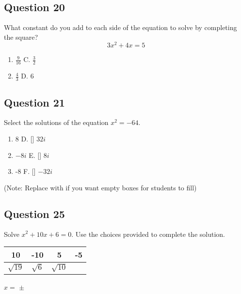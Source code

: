 \documentclass[12pt]{article}
\begin{document}
\subsection*{Question 20}
What constant do you add to each side of the equation to solve by completing the square?
\[ 3x^2 + 4x = 5 \]
\begin{enumerate}[label=\Alph*.]
    \item \( \frac{9}{16} \) \qquad C. \( \frac{3}{2} \)
    \item \( \frac{4}{3} \) \qquad D. \( 6 \)
\end{enumerate}

\subsection*{Question 21}
Select the solutions of the equation \( x^2 = -64 \).
\begin{enumerate}[label=\Alph*.]
    \item[\XBox] 8 \qquad \qquad D. [\XBox] \(32i\)
    \item[\XBox] \(-8i\) \qquad \quad E. [\XBox] \(8i\)
    \item[\XBox] -8 \qquad \qquad F. [\XBox] \(-32i\)
\end{enumerate}
(Note: Replace \XBox with \Square if you want empty boxes for students to fill)

\subsection*{Question 25}
Solve \( x^2 + 10x + 6 = 0 \). Use the choices provided to complete the solution.
\begin{center}
\begin{tabular}{|c|c|c|c|}
\hline
10 & -10 & 5 & -5 \\
\hline
\(\sqrt{19}\) & \(\sqrt{6}\) & \(\sqrt{10}\) & \\
\hline
\end{tabular}
\end{center}
\( x = \) \framebox[1.5cm]{\phantom{x}} \( \pm \) \framebox[1.5cm]{\phantom{x}}

\end{document}
